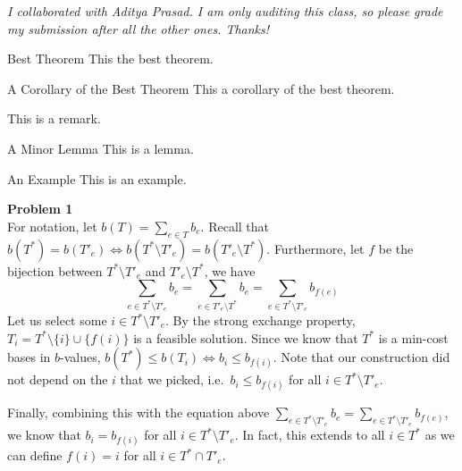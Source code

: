 \documentclass[a4paper]{/Users/dawei/.dotfiles/templates/preamble}
\begin{document}
\textit{I collaborated with Aditya Prasad. I am only auditing this class, so
please grade my submission after all the other ones. Thanks!}

\begin{theorem}{Best Theorem}{}
  This the best theorem.
\end{theorem}

\begin{corollary}{A Corollary of the Best Theorem}{}
  This a corollary of the best theorem.
\end{corollary}

\begin{remark}{}{}
  This is a remark.
\end{remark}

\begin{lemma}{A Minor Lemma}{}
  This is a lemma.
\end{lemma}

\begin{example}{An Example}{}
  This is an example.
\end{example}

\noindent\textbf{Problem 1} \\
For notation, let $b(T) = \sum_{e \in T} b_e$. Recall that $b(T^*) = b(T'_e)
\iff b(T^* \setminus T'_e) = b(T'_e \setminus T^*)$. Furthermore, let $f$ be the bijection between $T^* \setminus T'_e$ and $T'_e \setminus T^*$,
we have
\[
  \sum_{e \in T^* \setminus T'_e} b_e = \sum_{e \in T'_e \setminus T^*} b_e = \sum_{e \in T^* \setminus T'_e} b_{f(e)}
\]
Let us select some $i \in T^* \setminus T'_e$. By the strong exchange property,
$T_i = T^* \setminus \{i\} \cup \{f(i)\}$ is a feasible solution. Since we know
that $T^*$ is a min-cost bases in $b$-values, $b(T^*) \le b(T_i) \iff b_i \le
b_{f(i)}$. Note that our construction did not depend on the $i$ that we picked,
i.e.\ $b_i \le b_{f(i)}$ for all $i \in T^* \setminus T'_e$.

Finally, combining this with the equation above $\sum_{e \in T^* \setminus
T'_e} b_e = \sum_{e \in T^* \setminus T'_e} b_{f(e)}$, we know that $b_i
= b_{f(i)}$ for all $i \in T^* \setminus T'_e$. In fact, this extends to all $i
\in T^*$ as we can define $f(i) = i$ for all $i \in T^* \cap T'_e$.
\end{document}
